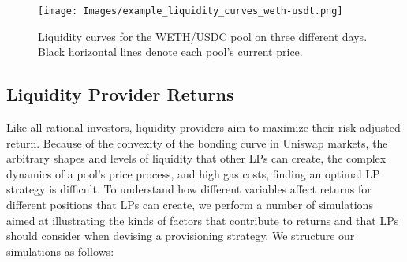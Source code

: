 \documentclass[11pt]{article}
\begin{document}
\begin{figure}[H]
    \centering
    \texttt{[image: Images/example\_liquidity\_curves\_weth-usdt.png]}
    \caption{Liquidity curves for the WETH/USDC pool on three different days. Black horizontal lines denote each pool's current price.}
    \label{fig:example_liquidity_curves_usdc-weth}
\end{figure}

\subsection{Liquidity Provider Returns}

Like all rational investors, liquidity providers aim to maximize their risk-adjusted return. Because of the convexity of the bonding curve in Uniswap markets, the arbitrary shapes and levels of liquidity that other LPs can create, the complex dynamics of a pool's price process, and high gas costs, finding an optimal LP strategy is difficult. To understand how different variables affect returns for different positions that LPs can create, we perform a number of simulations aimed at illustrating the kinds of factors that contribute to returns and that LPs should consider when devising a provisioning strategy. We structure our simulations as follows:
\end{document}
